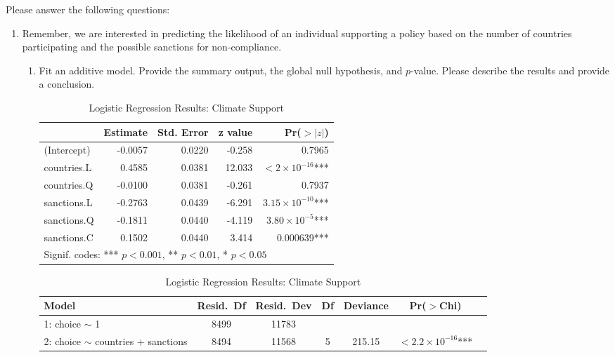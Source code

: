 \documentclass[12pt,letterpaper]{article}
\begin{document}
\newpage
\noindent Please answer the following questions:

\begin{enumerate}
	\item
	Remember, we are interested in predicting the likelihood of an individual supporting a policy based on the number of countries participating and the possible sanctions for non-compliance.
	\begin{enumerate}
		\item [] Fit an additive model. Provide the summary output, the global null hypothesis, and $p$-value. Please describe the results and provide a conclusion.
		 
			\vspace{10cm}
		\begin{table}[htbp]
			\centering
			\caption{Logistic Regression Results: Climate Support}
			\begin{tabular}{lrrrr}
				\toprule
				& Estimate & Std. Error & z value & Pr($>|z|$) \\
				\midrule
				(Intercept)   & -0.0057 & 0.0220 & -0.258 & 0.7965 \\
				countries.L   & 0.4585  & 0.0381 & 12.033 & $< 2\times10^{-16}$*** \\
				countries.Q   & -0.0100 & 0.0381 & -0.261 & 0.7937 \\
				sanctions.L   & -0.2763 & 0.0439 & -6.291 & $3.15\times10^{-10}$*** \\
				sanctions.Q   & -0.1811 & 0.0440 & -4.119 & $3.80\times10^{-5}$*** \\
				sanctions.C   & 0.1502  & 0.0440 & 3.414  & 0.000639*** \\
				\midrule
				\multicolumn{5}{l}{\footnotesize Signif. codes: *** $p<0.001$, ** $p<0.01$, * $p<0.05$} \\
				\bottomrule
			\end{tabular}
			
			\vspace{0.3cm}
			
	\begin{center}
		\begin{tabular}{lcccccc}
			\hline
			Model & Resid.\ Df & Resid.\ Dev & Df & Deviance & Pr($>$Chi) \\
			\hline
			1: choice $\sim$ 1 & 8499 & 11783 &  &  &  \\
			2: choice $\sim$ countries + sanctions & 8494 & 11568 & 5 & 215.15 & $< 2.2\times10^{-16}$*** \\
			\hline
		\end{tabular}
	\end{center}
	\vspace{0.3cm}
			

\end{table}
\end{enumerate}
\end{enumerate}
\end{document}
